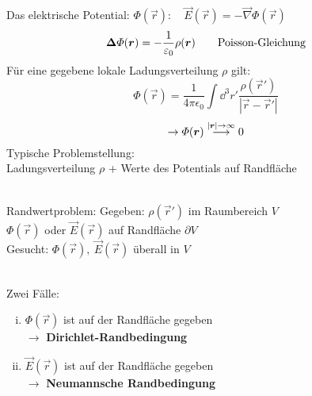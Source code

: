 Das elektrische Potential: $ \Phi(\vec{r}): \quad \vec{E}(\vec{r}) = - \vec{\nabla} \Phi(\vec{r}) $\\
$$ \bm{\Delta} \varPhi (\bm{r}) = -\frac{1}{\varepsilon_0} \rho(\bm{r})  \qquad \textrm{Poisson-Gleichung}$$
Für eine gegebene lokale Ladungsverteilung $ \rho $ gilt:
\begin{equation*}
\Phi(\vec{r}) = \frac{1}{4 \pi \epsilon_0} \int \dd^3 r' \frac{\rho(\vec{r}')}{|\vec{r} - \vec{r}'|}
\end{equation*}
%
%
%
%
%
%
\begin{equation*}
\rightarrow \Phi(\vec{r}) \buildrel |\vec{r}| \rightarrow \infty \over \longrightarrow 0
\end{equation*}
Typische Problemstellung:\\
Ladungsverteilung $\rho$ + Werte des Potentials auf Randfläche\\[5pt]
\bei\\
\begin{minipage}{.6\linewidth}
	Randwertproblem: Gegeben: $\rho(\vec{r}')$ im Raumbereich $V$\\
	$\Phi(\vec{r})$ oder $\vec{E}(\vec{r})$ auf Randfläche $\partial V$\\
	Gesucht: $\Phi(\vec{r}),\ \vec{E}(\vec{r})$ überall in $V$
\end{minipage}%
\begin{minipage}{.4\linewidth}
	\centering
\end{minipage}%
\\
Zwei Fälle:
\begin{enumerate}[i)]
	\item $ \Phi(\vec{r}) $ ist auf der Randfläche gegeben\\
	$ \rightarrow $ \textbf{Dirichlet-Randbedingung}
	\item $ \vec{E}(\vec{r}) $ ist auf der Randfläche gegeben\\
	$ \rightarrow $ \textbf{Neumannsche Randbedingung}
\end{enumerate}
